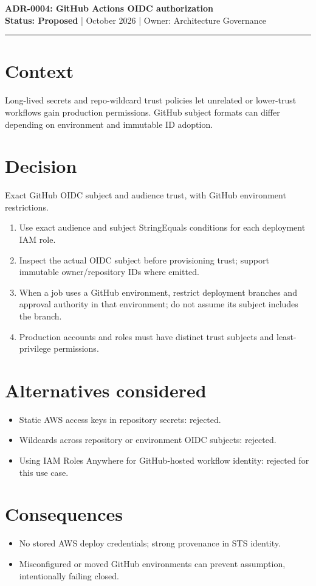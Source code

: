 \documentclass[11pt]{article}
\begin{document}
\begin{center}
{\LARGE\bfseries\color{Navy} ADR-0004: GitHub Actions OIDC authorization }\\[4mm]
\textbf{Status: Proposed} \quad |  October 2026 \quad | \quad Owner: Architecture Governance
\end{center}
\hrule
\section*{Context}
Long-lived secrets and repo-wildcard trust policies let unrelated or lower-trust workflows gain production permissions. GitHub subject formats can differ depending on environment and immutable ID adoption.
\section*{Decision}
Exact GitHub OIDC subject and audience trust, with GitHub environment restrictions.
\begin{enumerate}[leftmargin=*]
\item Use exact audience and subject StringEquals conditions for each deployment IAM role.
\item Inspect the actual OIDC subject before provisioning trust; support immutable owner/repository IDs where emitted.
\item When a job uses a GitHub environment, restrict deployment branches and approval authority in that environment; do not assume its subject includes the branch.
\item Production accounts and roles must have distinct trust subjects and least-privilege permissions.
\end{enumerate}
\section*{Alternatives considered}
\begin{itemize}[leftmargin=*]
\item Static AWS access keys in repository secrets: rejected.
\item Wildcards across repository or environment OIDC subjects: rejected.
\item Using IAM Roles Anywhere for GitHub-hosted workflow identity: rejected for this use case.
\end{itemize}
\section*{Consequences}
\begin{itemize}[leftmargin=*]
\item No stored AWS deploy credentials; strong provenance in STS identity.
\item Misconfigured or moved GitHub environments can prevent assumption, intentionally failing closed.
\end{itemize}
\end{document}
